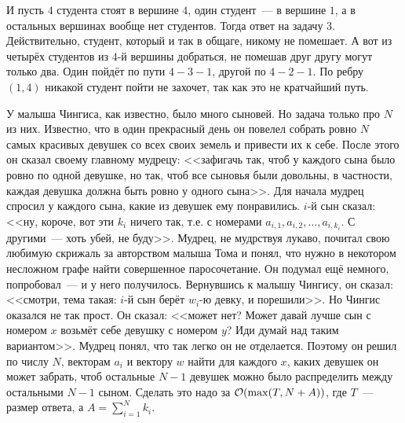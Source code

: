 \documentclass[addpoints]{exam}
\begin{document}
\begin{questions}
И пусть $4$ студента стоят в вершине $4$, один студент~--- в вершине $1$, а в остальных вершинах вообще нет студентов. Тогда ответ на задачу $3$. Действительно, студент, который и так в общаге, никому не помешает. А вот из четырёх студентов из $4$-й вершины добраться, не помешав друг другу могут только два. Один пойдёт по пути $4-3-1$, другой по $4-2-1$. По ребру $(1,4)$ никакой студент пойти не захочет, так как это не кратчайший путь.

\question[2] \label{scc} У малыша Чингиса, как известно, было много сыновей. Но задача только про $N$ из них. Известно, что в один прекрасный день он повелел собрать ровно $N$ самых красивых девушек со всех своих земель и привести их к себе. После этого он сказал своему главному мудрецу: <<зафигачь так, чтоб у каждого сына было ровно по одной девушке, но так, чтоб все сыновья были довольны, в частности, каждая девушка должна быть ровно у одного сына>>. Для начала мудрец спросил у каждого сына, какие из девушек ему понравились. $i$-й сын сказал: <<ну, короче, вот эти $k_i$ ничего так, т.е. с номерами $a_{i,1}, a_{i,2}, \ldots, a_{i,k_i}$. С другими~--- хоть убей, не буду>>. Мудрец, не мудрствуя лукаво, почитал свою любимую скрижаль за авторством малыша Тома и понял, что нужно в некотором несложном графе найти совершенное паросочетание. Он подумал ещё немного, попробовал~--- и у него получилось. Вернувшись к малышу Чингису, он сказал: <<смотри, тема такая: $i$-й сын берёт $w_i$-ю девку, и порешили>>. Но Чингис оказался не так прост. Он сказал: <<может нет? Может давай лучше сын с номером $x$ возьмёт себе девушку с номером $y$? Иди думай над таким вариантом>>. Мудрец понял, что так легко он не отделается. Поэтому он решил по числу $N$, векторам $a_i$ и вектору $w$ найти для каждого $x$, каких девушек он может забрать, чтоб остальные $N-1$ девушек можно было распределить между остальными $N-1$ сыном. Сделать это надо за $\mathcal{O}(\max(T, N + A))$, где $T$~--- размер ответа, а $A = \sum\limits_{i=1}^N k_i$. 


\end{questions}
\end{document}
